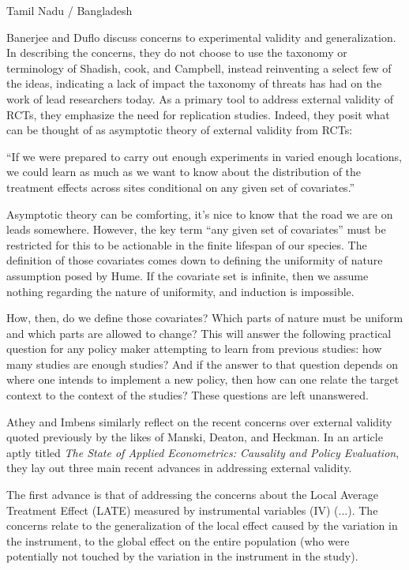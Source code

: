 \documentclass[a4paper,12pt]{article}
\begin{document}
Tamil Nadu / Bangladesh


Banerjee and Duflo \parencite*{Banerjee2014} discuss concerns to experimental validity and generalization. In describing the concerns, they do not choose to use the taxonomy or terminology of Shadish, cook, and Campbell, instead reinventing a select few of the ideas, indicating a lack of impact the taxonomy of threats has had on the work of lead researchers today. As a primary tool to address external validity of RCTs, they emphasize the need for replication studies. Indeed, they posit what can be thought of as asymptotic theory of external validity from RCTs:

\begin{displayquote}
``If we were prepared to carry out enough experiments in varied enough locations, we could learn as much as we want to know about the distribution of the treatment effects across sites conditional on any given set of covariates.''
\end{displayquote}

Asymptotic theory can be comforting, it's nice to know that the road we are on leads somewhere. However, the key term ``any given set of covariates'' must be restricted for this to be actionable in the finite lifespan of our species. The definition of those covariates comes down to defining the uniformity of nature assumption posed by Hume. If the covariate set is infinite, then we assume nothing regarding the nature of uniformity, and induction is impossible.

How, then, do we define those covariates? Which parts of nature must be uniform and which parts are allowed to change? This will answer the following practical question for any policy maker attempting to learn from previous studies: how many studies are enough studies? And if the answer to that question depends on where one intends to implement a new policy, then how can one relate the target context to the context of the studies? These questions are left unanswered.

Athey and Imbens \parencite*{Athey2017} similarly reflect on the recent concerns over external validity quoted previously by the likes of Manski, Deaton, and Heckman. In an article aptly titled \textit{The State of Applied Econometrics: Causality and Policy Evaluation}, they lay out three main recent advances in addressing external validity.

The first advance is that of addressing the concerns about the Local Average Treatment Effect (LATE) measured by instrumental variables (IV) (...). The concerns relate to the generalization of the local effect caused by the variation in the instrument, to the global effect on the entire population (who were potentially not touched by the variation in the instrument in the study).
\end{document}
